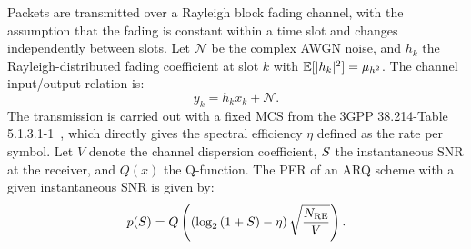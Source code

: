 Packets are transmitted over a Rayleigh block fading channel, with the assumption that the fading is constant within a time slot and changes independently between slots. Let $\mathcal{N}$ be the complex AWGN noise, and $h_k$ the Rayleigh-distributed fading coefficient at slot $k$ with $\mathbb{E}[\vert h_k\vert^2] = {\mu_{h^2}}$. The channel input/output relation is:
$$y_k = h_k x_k + \mathcal{N}.$$
The transmission is carried out with a fixed MCS from the 3GPP 38.214-Table 5.1.3.1-1~\cite{3gpp.38.214}, which directly gives the spectral efficiency $\eta$ defined as the rate per symbol. Let $V$ denote the channel dispersion coefficient, ${S}$ the instantaneous SNR at the receiver, and $Q(x)$ the Q-function. The PER of an ARQ scheme with a given instantaneous SNR is given by\cite{polyanskiy2010FBL,Wei2013FBLblockfading}:
\begin{equation}
    p({S})=Q\left(\left(\log_2\left(1+{S}\right)-\eta\right)\sqrt{\frac{N_{\mathrm{RE}}}{V}}\right).\label{eq:secModel_perARQ_instSNR}
\end{equation}

